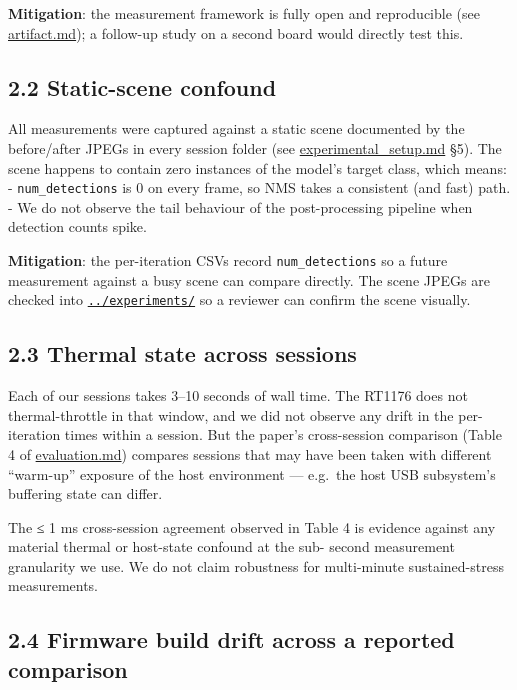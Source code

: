 \textbf{Mitigation}: the measurement framework is fully open and
reproducible (see \url{artifact.md}); a follow-up study on a second
board would directly test this.

\subsection{2.2 Static-scene confound}\label{static-scene-confound}

All measurements were captured against a static scene documented by the
before/after JPEGs in every session folder (see
\url{experimental_setup.md} §5). The scene happens to contain zero
instances of the model's target class, which means: -
\texttt{num\_detections} is 0 on every frame, so NMS takes a consistent
(and fast) path. - We do not observe the tail behaviour of the
post-processing pipeline when detection counts spike.

\textbf{Mitigation}: the per-iteration CSVs record
\texttt{num\_detections} so a future measurement against a busy scene
can compare directly. The scene JPEGs are checked into
\href{../experiments/}{\texttt{../experiments/}} so a reviewer can
confirm the scene visually.

\subsection{2.3 Thermal state across
sessions}\label{thermal-state-across-sessions}

Each of our sessions takes 3--10 seconds of wall time. The RT1176 does
not thermal-throttle in that window, and we did not observe any drift in
the per-iteration times within a session. But the paper's cross-session
comparison (Table 4 of \url{evaluation.md}) compares sessions that may
have been taken with different ``warm-up'' exposure of the host
environment --- e.g.~the host USB subsystem's buffering state can
differ.

The ≤ 1 ms cross-session agreement observed in Table 4 is evidence
against any material thermal or host-state confound at the sub- second
measurement granularity we use. We do not claim robustness for
multi-minute sustained-stress measurements.

\subsection{2.4 Firmware build drift across a reported
comparison}\label{firmware-build-drift-across-a-reported-comparison}

